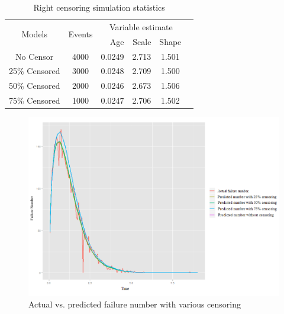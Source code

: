 \documentclass[12pt,letterpaper]{article}
\begin{document}
\begin{table}[htbp]
	\renewcommand{\arraystretch}{1.5}
	\small
	\centering
	\caption{Right censoring simulation statistics}
	\begin{tabular}{ccrrrc}
		\hline
		\multirow{2}[2]{*}{Models} & \multirow{2}[2]{*}{Events} & \multicolumn{3}{c}{Variable estimate}  \\ \cline{3-5}
		
		&       & Age   & Scale & Shape &  \\\hline
		No Censor & 4000  & \multicolumn{1}{c}{0.0249} & \multicolumn{1}{c}{2.713} & \multicolumn{1}{c}{1.501}  \\
		25\% Censored & 3000  & \multicolumn{1}{c}{0.0248} & \multicolumn{1}{c}{2.709} & \multicolumn{1}{c}{1.500} \\
		50\% Censored & 2000  & \multicolumn{1}{c}{0.0246} & \multicolumn{1}{c}{2.673} & \multicolumn{1}{c}{1.506}  \\
		75\% Censored & 1000  & \multicolumn{1}{c}{0.0247} & \multicolumn{1}{c}{2.706} & \multicolumn{1}{c}{1.502}  \\
		\hline
	\end{tabular}%
	\label{table:rightcensor}%
\end{table}%
\begin{landscape}
	\begin{figure}[htbp]
		\centering
		\includegraphics[width=9in]{Fig7}
		\caption{Actual vs. predicted failure number with various censoring}
		\label{fig:7}
	\end{figure}
\end{landscape}
\end{document}
